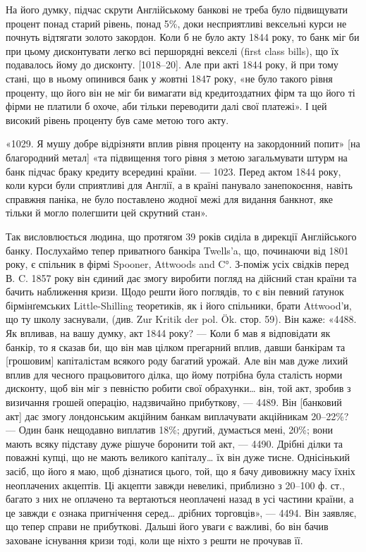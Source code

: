 На його думку, підчас скрути Англійському банкові не треба було підвищувати
процент понад старий рівень, понад 5\%, доки несприятливі вексельні
курси не почнуть відтягати золото закордон. Коли б не було акту 1844 року,
то банк міг би при цьому дисконтувати легко всі першорядні векселі (first class
bills), що їх подавалось йому до дисконту. [1018--20]. Але при акті 1844 року,
й при тому стані, що в ньому опинився банк у жовтні 1847 року, «не було
такого рівня проценту, що його він не міг би вимагати від кредитоздатних фірм
та що його ті фірми не платили б охоче, аби тільки переводити далі свої платежі».
І цей високий рівень проценту був саме метою того акту.

«1029. Я мушу добре відрізняти вплив рівня проценту на закордонний
попит» [на благородний метал] «та підвищення того рівня з метою загальмувати
штурм на банк підчас браку кредиту всередині країни. — 1023. Перед актом
1844 року, коли курси були сприятливі для Англії, а в країні панувало занепокоєння,
навіть справжня паніка, не було поставлено жодної межі для видання
банкнот, яке тільки й могло полегшити цей скрутний стан».

Так висловлюється людина, що протягом 39 років сиділа в дирекції Англійського
банку. Послухаймо тепер приватного банкіра Twells’a, що, починаючи
від 1801 року, є спільник в фірмі Spooner, Attwoods and C°. З-поміж усіх свідків
перед В. C. 1857 року він єдиний дає змогу виробити погляд на дійсний стан
країни та бачить наближення кризи. Щодо решти його поглядів, то є він певний
ґатунок бірмінґемських Little-Shilling теоретиків, як і його спільники, брати
Attwood’и, що ту школу заснували, (див. Zur Kritik der pol. Ök. стор. 59). Він
каже: «4488. Як впливав, на вашу думку, акт 1844 року? — Коли б мав я
відповідати як банкір, то я сказав би, що він мав цілком прегарний вплив,
давши банкірам та [грошовим] капіталістам всякого роду багатий урожай. Але
він мав дуже лихий вплив для чесного працьовитого ділка, що йому потрібна
була сталість норми дисконту, щоб він міг з певністю робити свої обрахунки\dots{}
він, той акт, зробив з визичання грошей операцію, надзвичайно прибуткову, —
4489. Він [банковий акт] дає змогу лондонським акційним банкам виплачувати
акційникам 20--22\%? — Один банк нещодавно виплатив 18\%; другий, думається
мені, 20\%; вони мають всяку підставу дуже рішуче боронити той акт, — 4490. Дрібні ділки та поважні
купці, що не мають великого капіталу\dots{} їх він
дуже тисне. Однісінький засіб, що його я маю, щоб дізнатися цього, той, що я
бачу дивовижну масу їхніх неоплачених акцептів. Ці акцепти завжди невеликі,
приблизно з 20--100 ф. ст., багато з них не оплачено та вертаються неоплачені
назад в усі частини країни, а це завжди є ознака пригнічення серед\dots{}
дрібних торговців», — 4494. Він заявляє, що тепер справи не прибуткові. Дальші
його уваги є важливі, бо він бачив заховане існування кризи тоді, коли ще
ніхто з решти не прочував її.

